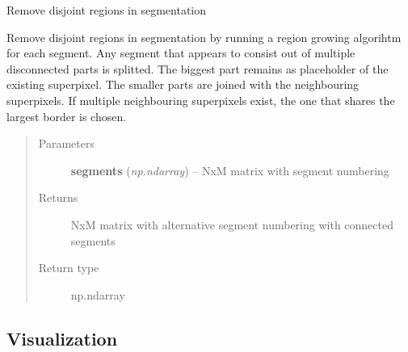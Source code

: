\documentclass[letterpaper,10pt,english]{sphinxmanual}
\begin{document}
\begin{fulllineitems}
\label{segmentation:flamingo.segmentation.postprocess.remove_disjoint}
Remove disjoint regions in segmentation

Remove disjoint regions in segmentation by running a region
growing algorihtm for each segment. Any segment that appears to
consist out of multiple disconnected parts is splitted. The
biggest part remains as placeholder of the existing superpixel.
The smaller parts are joined with the neighbouring superpixels.
If multiple neighbouring superpixels exist, the one that shares
the largest border is chosen.
\begin{quote}\begin{description}
\item[{Parameters}] \leavevmode
\textbf{segments} (\emph{np.ndarray}) -- NxM matrix with segment numbering

\item[{Returns}] \leavevmode
NxM matrix with alternative segment numbering with connected
segments

\item[{Return type}] \leavevmode
np.ndarray

\end{description}\end{quote}

\end{fulllineitems}



\subsection{Visualization}
\label{segmentation:module-flamingo.segmentation.plot}\label{segmentation:visualization}
\end{document}

